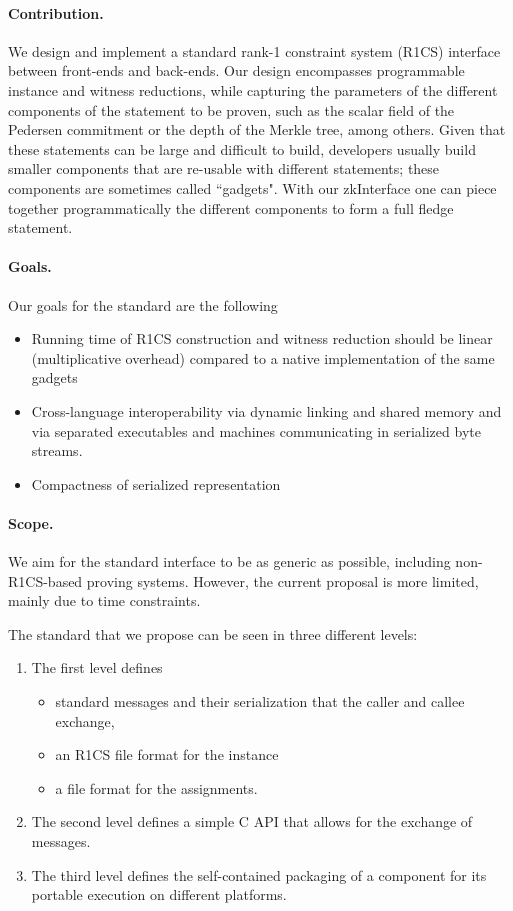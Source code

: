 \documentclass[a4paper,11pt]{article}
\begin{document}
		\paragraph{Contribution.} We design and implement a standard rank-1 constraint system (R1CS) interface between front-ends and back-ends. Our design encompasses programmable instance and witness reductions, while capturing the parameters of the different components of the statement to be proven, such as the scalar field of the Pedersen commitment or the depth of the Merkle tree, among others. Given that these statements can be large and difficult to build, developers usually build smaller components that are re-usable with different statements; these components are sometimes called ``gadgets". With our zkInterface one can piece together programmatically the different components to form a full fledge statement.
		
		\paragraph{Goals.} Our goals for the standard are the following
		\begin{itemize}
			\item Running time of R1CS construction and witness reduction should be linear (multiplicative overhead) compared to a native implementation of the same gadgets
			\item Cross-language interoperability via dynamic linking and shared memory and via separated executables and machines communicating in serialized byte streams.
			\item Compactness of serialized representation
		\end{itemize}
	
		\paragraph{Scope.} We aim for the standard interface to be as generic as possible, including non-R1CS-based proving systems. However, the current proposal is more limited, mainly due to time constraints.
		
		The standard that we propose can be seen in three different levels:
		\begin{enumerate}
			\item The first level defines  
			\begin{itemize}
				\item standard messages and their serialization that the caller and callee exchange, 
				\item an R1CS file format for the instance
				\item a file format for the assignments.
			\end{itemize}
			\item The second level defines a simple C API that allows for the exchange of messages.
			\item The third level defines the self-contained packaging of a component for its portable execution on different platforms.
		\end{enumerate}
\end{document}
